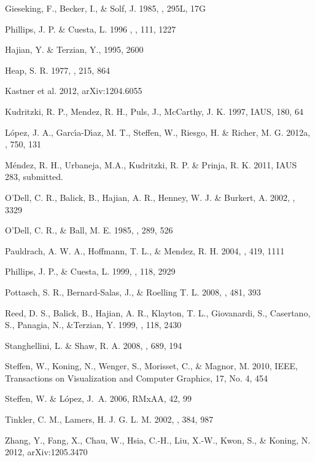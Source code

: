 \documentclass{aa}
\begin{document}
\begin{thebibliography}{}
 Gieseking, F., Becker,
  I., \& Solf, J. 1985, \apj, 295L, 17G
  
 Phillips, J. P. \& Cuesta, L. 1996
, \aj, 111, 1227

 Hajian, Y. \&  Terzian, Y., 1995,  2600





 Heap, S. R. 1977, \apj, 215, 864

 Kastner et al. 2012, arXiv:1204.6055

 Kudritzki, R. P., Mendez,
  R. H., Puls, J., McCarthy, J. K. 1997, IAUS, 180, 64

  
 L\'opez, J. A., Garc\'{\i}a-D\'{\i}az, M. T., Steffen, W., Riesgo, H. \& Richer, M. G. 2012a, \apj, 750, 131


 M\'endez, R. H., Urbaneja,
  M.A., Kudritzki, R. P. \& Prinja, R. K. 2011, IAUS 283, submitted.


  
 O'Dell, C. R., Balick, B., Hajian, A. R., Henney, W. J.
  \& Burkert, A. 2002, , 3329


 O'Dell, C. R., \& Ball,
  M. E. 1985, \apj, 289, 526

 Pauldrach, A. W. A.,
  Hoffmann, T. L., \& Mendez, R. H. 2004, \aap, 419, 1111

 Phillips, J. P., \&
  Cuesta, L. 1999, \aj, 118, 2929

 Pottasch, S. R., Bernard-Salas, J.,
  \& Roelling T. L.  2008, \aap, 481, 393

 Reed, D. S., Balick, B., Hajian, A. R.,
  Klayton, T. L., Giovanardi, S., Casertano, S., Panagia, N., \&Terzian, Y.
  1999, \aj, 118, 2430
  
  Stanghellini, L. \& Shaw, R. A. 2008, \apj, 689, 194
  
  Steffen, W., Koning, N., Wenger, S., Morisset, C., \& Magnor, M.
 2010, IEEE, Transactions on Visualization and Computer Graphics, 17, No. 4, 454 


 
  
 Steffen, W. \& L{\'o}pez, J.~A.
  2006, RMxAA, 42, 99 

 Tinkler, C. M., Lamers,
  H. J. G. L. M. 2002, \aap, 384, 987



 Zhang, Y., Fang, X., Chau, W., Hsia, C.-H., Liu, X.-W., Kwon, S., \& Koning, N. 2012, arXiv:1205.3470

\end{thebibliography}
\end{document}
